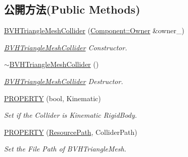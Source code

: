\subsection*{公開方法(Public Methods)}
\begin{DoxyCompactItemize}
\item 
\hyperlink{class_i_dream_sky_1_1_b_v_h_triangle_mesh_collider_a8d0008d2099e2b218c083788adedad18}{B\+V\+H\+Triangle\+Mesh\+Collider} (\hyperlink{class_i_dream_sky_1_1_component_1_1_owner}{Component\+::\+Owner} \&owner\+\_\+)
\begin{DoxyCompactList}\small\item\em \hyperlink{class_i_dream_sky_1_1_b_v_h_triangle_mesh_collider}{B\+V\+H\+Triangle\+Mesh\+Collider} Constructor. \end{DoxyCompactList}\item 
\hyperlink{class_i_dream_sky_1_1_b_v_h_triangle_mesh_collider_a5e1ace4b16a1451d6c7bd8f0f8c88ad8}{$\sim$\+B\+V\+H\+Triangle\+Mesh\+Collider} ()
\begin{DoxyCompactList}\small\item\em \hyperlink{class_i_dream_sky_1_1_b_v_h_triangle_mesh_collider}{B\+V\+H\+Triangle\+Mesh\+Collider} Destructor. \end{DoxyCompactList}\item 
\hyperlink{class_i_dream_sky_1_1_b_v_h_triangle_mesh_collider_a41f2ceb521f00f81bc0c3ddb531c200f}{P\+R\+O\+P\+E\+R\+TY} (bool, Kinematic)
\begin{DoxyCompactList}\small\item\em Set if the Collider is Kinematic Rigid\+Body. \end{DoxyCompactList}\item 
\hyperlink{class_i_dream_sky_1_1_b_v_h_triangle_mesh_collider_ad86c4a73487c849af6a73a782db2a6d5}{P\+R\+O\+P\+E\+R\+TY} (\hyperlink{class_i_dream_sky_1_1_resource_path}{Resource\+Path}, Collider\+Path)
\begin{DoxyCompactList}\small\item\em Set the File Path of B\+V\+H\+Triangle\+Mesh. \end{DoxyCompactList}\end{DoxyCompactItemize}
